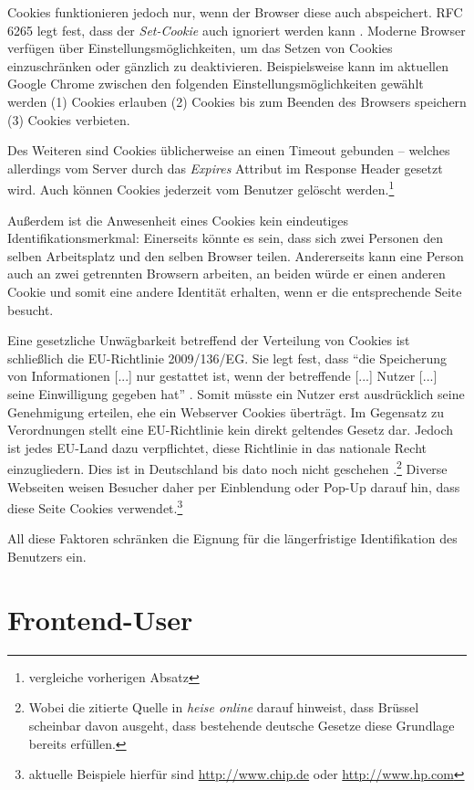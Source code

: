 \begin{appendices}
Cookies funktionieren jedoch nur, wenn der Browser diese auch abspeichert. RFC 6265 legt fest, dass der \emph{Set-Cookie} auch ignoriert werden kann \cite[S. 16]{InternetEngineeringTaskForce.April2011}. Moderne Browser verfügen über Einstellungsmöglichkeiten, um das Setzen von Cookies einzuschränken oder gänzlich zu deaktivieren. Beispielsweise kann im aktuellen Google Chrome zwischen den folgenden Einstellungsmöglichkeiten gewählt werden (1) Cookies erlauben (2) Cookies bis zum Beenden des Browsers speichern (3) Cookies verbieten.

Des Weiteren sind Cookies üblicherweise an einen Timeout gebunden -- welches allerdings vom Server durch das \emph{Expires} Attribut im Response Header gesetzt wird. Auch können Cookies jederzeit vom Benutzer gelöscht werden.\footnote{vergleiche vorherigen Absatz}

Außerdem ist die Anwesenheit eines Cookies kein eindeutiges Identifikationsmerkmal: Einerseits könnte es sein, dass sich zwei Personen den selben Arbeitsplatz und den selben Browser teilen. Andererseits kann eine Person auch an zwei getrennten Browsern arbeiten, an beiden würde er einen anderen Cookie und somit eine andere Identität erhalten, wenn er die entsprechende Seite besucht.

Eine gesetzliche Unwägbarkeit betreffend der Verteilung von Cookies ist schließlich die EU-Richtlinie 2009/136/EG. Sie legt fest, dass \enquote{die Speicherung von Informationen [...] nur gestattet ist, wenn der betreffende [...] Nutzer [...] seine Einwilligung gegeben hat} \cite[Artikel 2 Absatz 5]{EUROPEANPARLIAMENTANDOFTHECOUNCIL.2009}. Somit müsste ein Nutzer erst ausdrücklich seine Genehmigung erteilen, ehe ein Webserver Cookies überträgt. Im Gegensatz zu Verordnungen stellt eine EU-Richtlinie kein direkt geltendes Gesetz dar. Jedoch ist jedes EU-Land dazu verpflichtet, diese Richtlinie in das nationale Recht einzugliedern. Dies ist in Deutschland bis dato noch nicht geschehen \cite{Storing.2014}.\footnote{Wobei die zitierte Quelle in \emph{heise online} darauf hinweist, dass Brüssel scheinbar davon ausgeht, dass bestehende deutsche Gesetze diese Grundlage bereits erfüllen.} Diverse Webseiten weisen Besucher daher per Einblendung oder Pop-Up darauf hin, dass diese Seite Cookies verwendet.\footnote{aktuelle Beispiele hierfür sind \url{http://www.chip.de} oder \url{http://www.hp.com}}

All diese Faktoren schränken die Eignung für die längerfristige Identifikation des Benutzers ein.

\section{Frontend-User}


\end{appendices}
